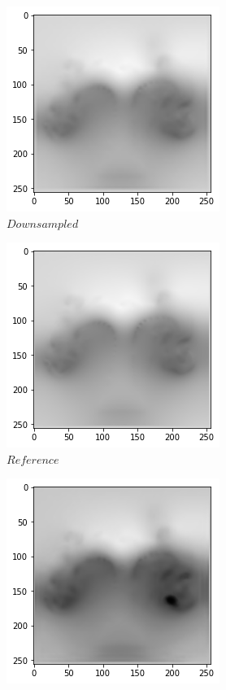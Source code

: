 \documentclass[a4paper,12pt,twoside]{report}
\begin{document}
\begin{figure}
	\centering
	\begin{subfigure}{0.32\textwidth}
		\centering
		\includegraphics[scale=0.4]{superresolution/pressure_low.png}
		\caption{$Downsampled$}
	\end{subfigure}
	\begin{subfigure}{0.32\textwidth}
		\centering
		\includegraphics[scale=0.4]{superresolution/pressure_ref.png}
		\caption{$Reference$}
	\end{subfigure}
	\begin{subfigure}{0.32\textwidth}
		\centering
		\includegraphics[scale=0.4]{superresolution/pressure_mse.png}

\end{subfigure}
\end{figure}
\end{document}
